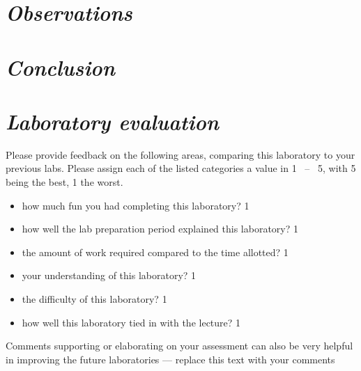 \documentclass[epsfig,12pt]{article}
\begin{document}
\section*{\textit{Observations}}


\section*{\textit{Conclusion}}


\newpage
\section*{\textit{Laboratory evaluation}}

	Please provide feedback on the following areas, comparing this laboratory to your previous labs.
	Please assign each of the listed categories a value in 1 ~--~ 5, with 5 being the best, 1 the worst.

\bigskip
\begin{itemize}
\item
	how much fun you had completing this laboratory?
	\hfill 1

\item
	how well the lab preparation period explained this laboratory?
	\hfill 1

\item
	the amount of work required compared to the time allotted?
	\hfill 1

\item
	your understanding of this laboratory?
	\hfill 1

\item
	the difficulty of this laboratory?
	\hfill 1

\item
	how well this laboratory tied in with the lecture?
	\hfill 1
\end{itemize}

\bigskip\noindent
	Comments supporting or elaborating on your assessment can also be very helpful in improving the future laboratories
	--- replace this text with your comments
\end{document}

